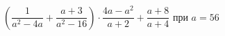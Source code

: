 \begin{ex}
	\begin{condition}
		\( \left( \dfrac{1}{a^2-4a}+\dfrac{a+3}{a^2-16} \right)\cdot\dfrac{4a-a^2}{a+2}+\dfrac{a+8}{a+4} \) при \( a=56 \)
	\end{condition}
\end{ex}
